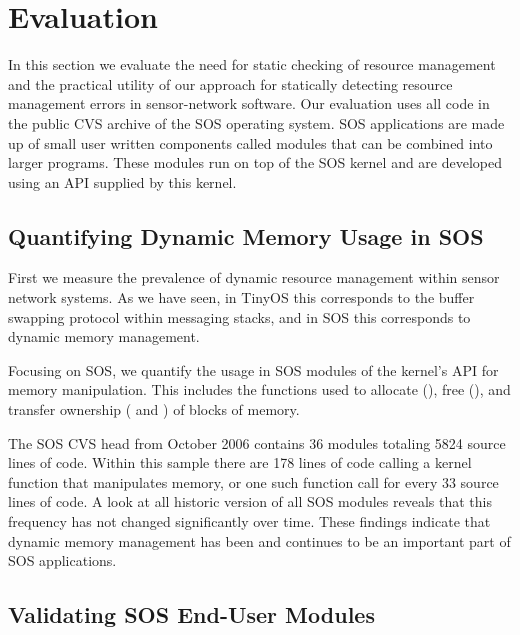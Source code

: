 \section{Evaluation}
\label{sec:eval}

In this section we evaluate the need for static checking of resource
management and the practical utility of our approach for statically
detecting resource management errors in sensor-network software.  
%
Our evaluation uses all code in the public CVS archive of the SOS
operating system.
%
SOS applications are made up of small user written components called
modules that can be combined into larger programs.  
%
These modules run on top of the SOS kernel and are developed using an
API supplied by this kernel.



\subsection{Quantifying Dynamic Memory Usage in SOS}



First we measure the prevalence of dynamic resource management within
sensor network systems.  
%
As we have seen, in TinyOS this corresponds to the buffer swapping
protocol within messaging stacks, and in SOS this corresponds to dynamic
memory management.



Focusing on SOS, we quantify the usage in SOS modules of the kernel's
API for memory manipulation.
%
This includes the functions used to allocate (), free
(), and transfer ownership ( and
) of blocks of memory.



The SOS CVS head from October 2006 contains 36 modules totaling 5824 source 
lines of code.  
%
Within this sample there are 178 lines of code
calling a kernel function that manipulates memory, or one such function call
for every 33 source lines of code.  
%
A look at all historic version of all
SOS modules reveals that this frequency has not changed significantly
over time.  
%
These findings indicate that dynamic memory management has been
and continues to be an important part of SOS applications.



\subsection{Validating SOS End-User Modules}



